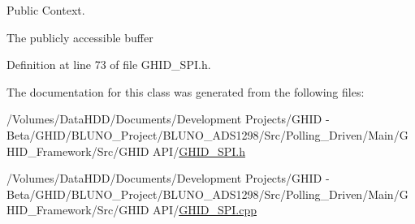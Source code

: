 \-Public \-Context. 

\-The publicly accessible buffer 

\-Definition at line 73 of file \-G\-H\-I\-D\-\_\-\-S\-P\-I.\-h.



\-The documentation for this class was generated from the following files\-:\begin{DoxyCompactItemize}
\item 
/\-Volumes/\-Data\-H\-D\-D/\-Documents/\-Development Projects/\-G\-H\-I\-D -\/ Beta/\-G\-H\-I\-D/\-B\-L\-U\-N\-O\-\_\-\-Project/\-B\-L\-U\-N\-O\-\_\-\-A\-D\-S1298/\-Src/\-Polling\-\_\-\-Driven/\-Main/\-G\-H\-I\-D\-\_\-\-Framework/\-Src/\-G\-H\-I\-D A\-P\-I/\hyperlink{_g_h_i_d___s_p_i_8h}{\-G\-H\-I\-D\-\_\-\-S\-P\-I.\-h}\item 
/\-Volumes/\-Data\-H\-D\-D/\-Documents/\-Development Projects/\-G\-H\-I\-D -\/ Beta/\-G\-H\-I\-D/\-B\-L\-U\-N\-O\-\_\-\-Project/\-B\-L\-U\-N\-O\-\_\-\-A\-D\-S1298/\-Src/\-Polling\-\_\-\-Driven/\-Main/\-G\-H\-I\-D\-\_\-\-Framework/\-Src/\-G\-H\-I\-D A\-P\-I/\hyperlink{_g_h_i_d___s_p_i_8cpp}{\-G\-H\-I\-D\-\_\-\-S\-P\-I.\-cpp}\end{DoxyCompactItemize}
